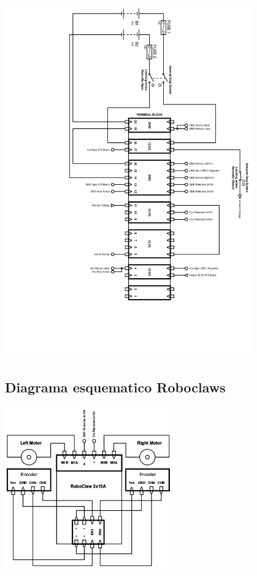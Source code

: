 \documentclass[a4paper]{book}
\begin{document}
\begin{center}
\includegraphics[width=0.8\textwidth]{Figures/Hardware/Esquematicos/JustinaWiringDiagram.jpg}
\label{fig:Hardware:Partes:Diagrama:Esquematico:General}
\end{center}

\subsection{Diagrama esquematico Roboclaws}

\begin{center}
\includegraphics[width=0.55\textwidth]{Figures/Hardware/Esquematicos/Roboclaw_1.png}
\label{fig:Hardware:Partes:Diagrama:Esquematico:Roboclaw:1}
\end{center}
\end{document}

